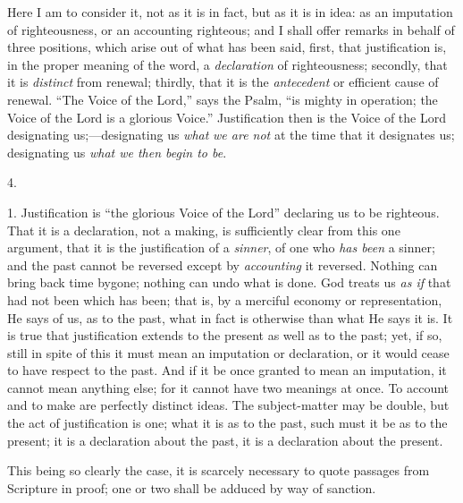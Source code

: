 Here I am to consider it, not as it is in fact, but as it is in
idea: as an imputation of righteousness, or an accounting righteous;
and I shall offer remarks in behalf of three positions, which arise
out of what has been said, first, that justification is, in the proper
meaning of the word, a \emph{declaration} of righteousness; secondly,
that it is \emph{distinct} from renewal; thirdly, that it is the \emph{antecedent}
or efficient cause of renewal. ``The Voice of the Lord,'' says
the Psalm, ``is mighty in operation; the Voice of the Lord is a
glorious Voice.'' Justification then is the Voice of the Lord
designating us;—designating us \emph{what} \emph{we are not} at
the time that it designates us; designating us \emph{what we then begin
to be}.

4.

1. Justification is ``the glorious Voice of the Lord''
declaring us to be righteous. That it is a declaration, not a making,
is sufficiently clear from this one argument, that it is the
justification of a \emph{sinner}, of one who \emph{has been} a sinner;
and the past cannot be reversed except by \emph{accounting} it
reversed. Nothing can bring back time bygone; nothing can undo what is
done. God treats us \emph{as if} that had not been which has been;
that is, by a merciful economy or representation, He says of us, as to
the past, what in fact is otherwise than what He says it is. It is
true that justification extends to the present as well as to the past;
yet, if so, still in spite of this it must mean an imputation or
declaration, or it would cease to have respect to the past. And if it
be once granted to mean an imputation, it cannot mean anything else;
for it cannot have two meanings at once. To account and to make are
perfectly distinct ideas. The subject-matter may be double, but the
act of justification is one; what it is as to the past, such must it
be as to the present; it is a declaration about the past, it is a
declaration about the present.

This being so clearly the case, it is scarcely necessary to quote
passages from Scripture in proof; one or two shall be adduced by way
of sanction.

